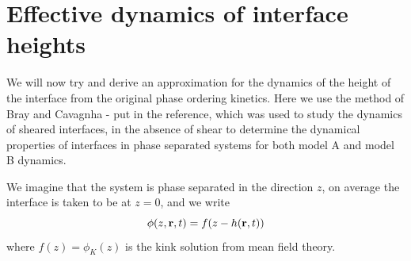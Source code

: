 \section{Effective dynamics of interface heights}\label{heightd}
We will now try and derive an approximation for the dynamics of the  height of the interface from the original phase ordering kinetics. Here we use the method of Bray and Cavagnha - put in the reference, which was used to study the dynamics of sheared interfaces, in the absence of shear to determine the dynamical properties of interfaces in phase separated systems for both model A and model B dynamics.

We imagine that the system is phase separated in the direction  $z$, on average the interface is taken to be at $z=0$, and we write
\begin{equation}
\phi(z,{\bf r},t) = f(z-h({\bf r},t))\label{hans}
\end{equation}
where $f(z)=\phi_K(z)$ is the kink solution from mean field theory.
\\


